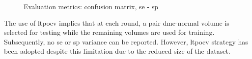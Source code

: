 \begin{figure}
  \caption{Evaluation metrics:
    \protect{} confusion matrix,
    \protect{} \gls{se} - \gls{sp}
  }
  \label{fig:evaluation}
\end{figure}

The use of \gls{ltpocv} implies that at each round, a pair \gls{dme}-normal volume is selected for testing while the remaining volumes are used for training.
Subsequently, no \gls{se} or \gls{sp} variance can be reported.
However, \gls{ltpocv} strategy has been adopted despite this limitation due to the reduced size of the dataset.

